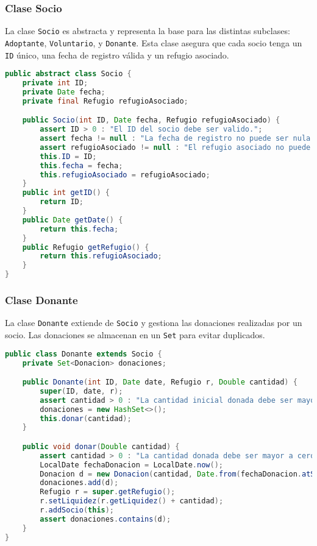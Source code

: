\subsubsection{Clase Socio}
La clase \texttt{Socio} es abstracta y representa la base para las distintas subclases: 
\texttt{Adoptante}, \texttt{Voluntario}, y \texttt{Donante}. Esta clase asegura que 
cada socio tenga un \texttt{ID} único, una fecha de registro válida y un refugio asociado.
\label{codigo:socio}
\begin{lstlisting}[style = javaNormal, language=Java] 
public abstract class Socio {
    private int ID; 
    private Date fecha;
    private final Refugio refugioAsociado;

    public Socio(int ID, Date fecha, Refugio refugioAsociado) {
        assert ID > 0 : "El ID del socio debe ser valido.";
        assert fecha != null : "La fecha de registro no puede ser nula.";
        assert refugioAsociado != null : "El refugio asociado no puede ser nulo.";
        this.ID = ID;
        this.fecha = fecha;
        this.refugioAsociado = refugioAsociado;
    }
    public int getID() {
        return ID;
    }
    public Date getDate() {
        return this.fecha;
    }
    public Refugio getRefugio() {
        return this.refugioAsociado;
    }
}
\end{lstlisting}
\label{codigo:donante}
\subsubsection{Clase Donante}
La clase \texttt{Donante} extiende de \texttt{Socio} y gestiona las donaciones realizadas 
por un socio. Las donaciones se almacenan en un \texttt{Set} para evitar duplicados.

\begin{lstlisting}[style = javaNormal, language=Java] 
public class Donante extends Socio {
    private Set<Donacion> donaciones;

    public Donante(int ID, Date date, Refugio r, Double cantidad) {
        super(ID, date, r);
        assert cantidad > 0 : "La cantidad inicial donada debe ser mayor a cero.";
        donaciones = new HashSet<>();
        this.donar(cantidad);
    }

    public void donar(Double cantidad) {
        assert cantidad > 0 : "La cantidad donada debe ser mayor a cero.";
        LocalDate fechaDonacion = LocalDate.now();
        Donacion d = new Donacion(cantidad, Date.from(fechaDonacion.atStartOfDay(ZoneId.systemDefault()).toInstant()), this);
        donaciones.add(d);
        Refugio r = super.getRefugio();
        r.setLiquidez(r.getLiquidez() + cantidad);
        r.addSocio(this);
        assert donaciones.contains(d);
    }
}
\end{lstlisting}

